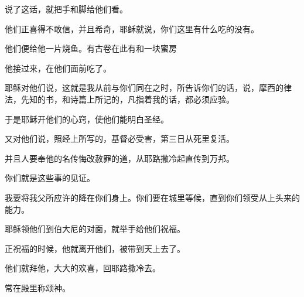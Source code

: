 \documentclass[12pt,oneside]{book}
\begin{document}
说了这话，就把手和脚给他们看。

他们正喜得不敢信，并且希奇，耶稣就说，你们这里有什么吃的没有。

他们便给他一片烧鱼。有古卷在此有和一块蜜房

他接过来，在他们面前吃了。

耶稣对他们说，这就是我从前与你们同在之时，所告诉你们的话，说，摩西的律法，先知的书，和诗篇上所记的，凡指着我的话，都必须应验。

于是耶稣开他们的心窍，使他们能明白圣经。

又对他们说，照经上所写的，基督必受害，第三日从死里复活。

并且人要奉他的名传悔改赦罪的道，从耶路撒冷起直传到万邦。

你们就是这些事的见证。

我要将我父所应许的降在你们身上。你们要在城里等候，直到你们领受从上头来的能力。

耶稣领他们到伯大尼的对面，就举手给他们祝福。

正祝福的时候，他就离开他们，被带到天上去了。

他们就拜他，大大的欢喜，回耶路撒冷去。

常在殿里称颂神。



\backmatter
\end{document}
